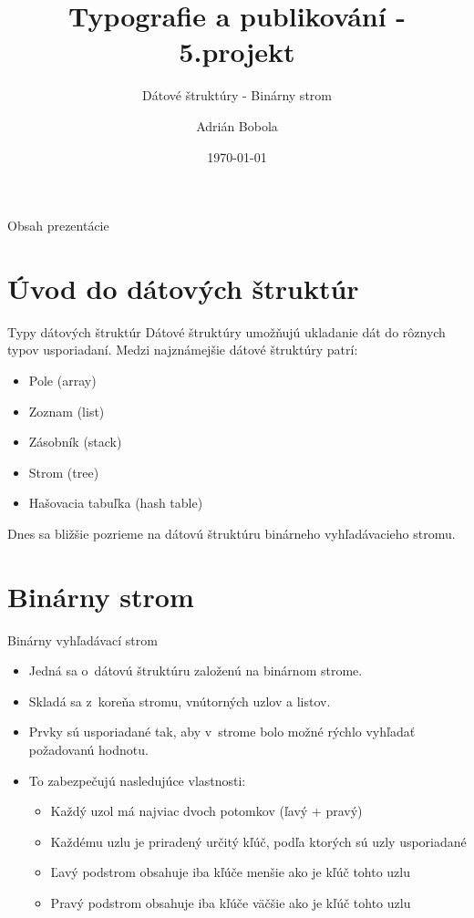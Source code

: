 \documentclass[10pt]{beamer}
\title{Typografie a publikování - 5.projekt}
\subtitle{Dátové štruktúry - Binárny strom}
\author{Adrián Bobola}
\institute{Vysoké učení technické v~Brně\\
Fakulta informačních technologií}
\date{\today}
\begin{document}
\begin{frame}
    \titlepage
\end{frame}

\begin{frame}{Obsah prezentácie}
    \tableofcontents
\end{frame}

\section{Úvod do dátových štruktúr}
\begin{frame}{Typy dátových štruktúr}
    Dátové štruktúry umožňujú ukladanie dát do rôznych typov usporiadaní.
    Medzi najznámejšie dátové štruktúry patrí: 
    \begin{itemize}
        \item{Pole (array)}
        \item{Zoznam (list)}
        \item{Zásobník (stack)}
        \item{Strom (tree)}
        \item{Hašovacia tabuľka (hash table)}
    \end{itemize}
    Dnes sa bližšie pozrieme na dátovú štruktúru binárneho vyhľadávacieho stromu.
\end{frame}

\section{Binárny strom}
\begin{frame}{Binárny vyhľadávací strom}
    \begin{itemize}
        \item{Jedná sa o~dátovú štruktúru založenú na binárnom strome.}
        \item{Skladá sa z~koreňa stromu, vnútorných uzlov a listov.}
        \item{Prvky sú usporiadané tak, aby v~strome bolo možné rýchlo vyhľadať požadovanú hodnotu.}
        \item{To zabezpečujú nasledujúce vlastnosti:}
            \begin{itemize}
            \item{Každý uzol má najviac dvoch potomkov (ľavý + pravý)}
            \item{Každému uzlu je priradený určitý kľúč, podľa ktorých sú uzly usporiadané}
            \item{Ľavý podstrom obsahuje iba kľúče menšie ako je kľúč tohto uzlu}
            \item{Pravý podstrom obsahuje iba kľúče väčšie ako je kľúč tohto uzlu}
            \end{itemize}
    \end{itemize}
\end{frame}
\end{document}

